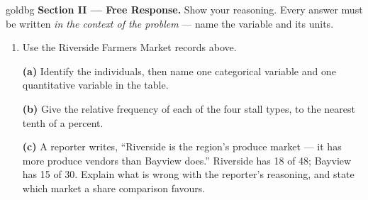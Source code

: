 \documentclass[12pt]{article}
\begin{document}
\begin{enumerate}[leftmargin=1.9em, itemsep=0.13in]
\end{enumerate}

\vspace{0.14in}

\boxguard[18]
\begin{headlinebox}{goldbg}
\small
\textbf{Section II --- Free Response.} Show your reasoning. Every answer must be written
\emph{in the context of the problem} --- name the variable and its units.
\end{headlinebox}

\vspace{0.10in}

\begin{enumerate}[leftmargin=1.9em, itemsep=0.16in, resume]

  \boxguard[16]
  \item Use the Riverside Farmers Market records above.

        \vspace{6pt}
        \textbf{(a)} Identify the individuals, then name one categorical variable and one
        quantitative variable in the table.\\[4pt]

        \boxguard[15]
        \vspace{6pt}
        \textbf{(b)} Give the relative frequency of each of the four stall types, to the nearest
        tenth of a percent.\\[4pt]

        \boxguard[15]
        \vspace{6pt}
        \textbf{(c)} A reporter writes, ``Riverside is the region's produce market --- it has
        more produce vendors than Bayview does.'' Riverside has 18 of 48; Bayview has 15 of 30.
        Explain what is wrong with the reporter's reasoning, and state which market a share
        comparison favours.\\[4pt]


\end{enumerate}
\end{document}
